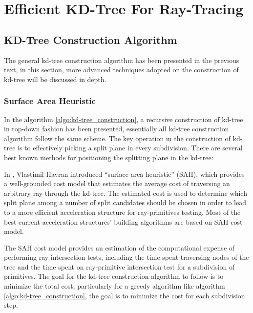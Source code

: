 
\chapter{Efficient KD-Tree For Ray-Tracing}
\setcounter{figure}{1}      %
\label{ch:effiecient_kd-tree}

\section{KD-Tree Construction Algorithm} 
The general kd-tree construction algorithm has been presented in the previous text, in this section, more advanced techniques adopted on the construction of kd-tree will be discussed in depth.

\subsection{Surface Area Heuristic}

In the algorithm \ref{algo:kd-tree_construction}, a recursive construction of kd-tree in top-down fashion has been presented, essentially all kd-tree construction algorithm follow the same scheme. The key operation in the construction of kd-tree is to effectively picking a split plane in every subdivision. There are several best known methods for positioning the splitting plane in the kd-tree:

\begin{comment} 
\begin{figure}[htp] 
    \centering 
    \fbox{\texttt{[image: figKDTreeSubdivideSpatialMid.pdf]}} 
    \renewcommand{\thefigure}{\thechapter.\arabic{figure}}
    \caption[The scene with the spatial median subdivision]{\emph{ The scene with the spatial median subdivision}}
    \label{fig:kd-tree_subdivide_spatial_mid}
\end{figure}
\end{comment}

In \cite{havran2000}, Vlastimil Havran introduced ``surface area heuristic'' (SAH), which provides a well-grounded cost model that estimates the average cost of traversing an arbitrary ray through the kd-tree. The estimated cost is used to determine which split plane among a number of split candidates should be chosen in order to lead to a more efficient acceleration structure for ray-primitives testing. Most of the best current acceleration structures' building algorithms are based on SAH cost model. 

The SAH cost model provides an estimation of the computational expense of performing ray intersection tests, including the time spent traversing nodes of the tree and the time spent on ray-primitive intersection test for a subdivision of primitives. The goal for the kd-tree construction algorithm to follow is to minimize the total cost, particularly for a greedy algorithm like algorithm \ref{algo:kd-tree_construction}, the goal is to minimize the cost for each subdivision step.

